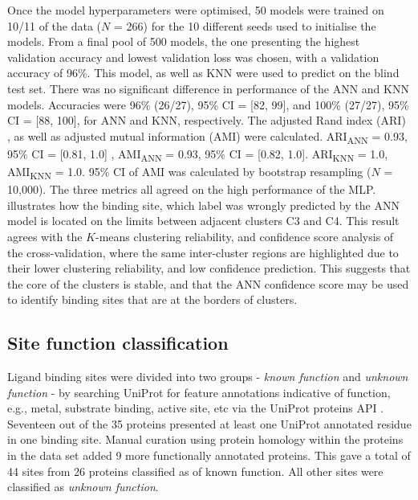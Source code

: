 Once the model hyperparameters were optimised, 50 models were trained on 10/11 of the data ($N$ = 266) for the 10 different seeds used to initialise the models. From a final pool of 500 models, the one presenting the highest validation accuracy and lowest validation loss was chosen, with a validation accuracy of 96\%. This model, as well as KNN were used to predict on the blind test set. There was no significant difference in performance of the ANN and KNN models. Accuracies were 96\% (26/27), 95\% CI = [82, 99], and 100\% (27/27), 95\% CI = [88, 100], for ANN and KNN, respectively. The adjusted Rand index (ARI) \cite{RAND_1971_ARI, HUBERT_1985_ARI}, as well as adjusted mutual information (AMI) \cite{VINH_2009_AMI, VINH_2010_AMI} were calculated. ARI\textsubscript{ANN} = 0.93, 95\% CI = [0.81, 1.0] \cite{STEINLEY_2016_ARI}, AMI\textsubscript{ANN} = 0.93, 95\% CI = [0.82, 1.0]. ARI\textsubscript{KNN} = 1.0, AMI\textsubscript{KNN} = 1.0. 95\% CI of AMI was calculated by bootstrap resampling ($N$ = 10,000). The three metrics all agreed on the high performance of the MLP.  illustrates how the binding site, which label was wrongly predicted by the ANN model is located on the limits between adjacent clusters C3 and C4. This result agrees with the $K$-means clustering reliability, and confidence score analysis of the cross-validation, where the same inter-cluster regions are highlighted due to their lower clustering reliability, and low confidence prediction. This suggests that the core of the clusters is stable, and that the ANN confidence score may be used to identify binding sites that are at the borders of clusters.

\subsection{Site function classification}

Ligand binding sites were divided into two groups - \textit{known function} and \textit{unknown function} - by searching UniProt \cite{UNIPROT_2019_UNIPROT} for feature annotations indicative of function, e.g., metal, substrate binding, active site, etc via the UniProt proteins API \cite{NIGHTINGALE_2017_API}. Seventeen out of the 35 proteins presented at least one UniProt annotated residue in one binding site. Manual curation using protein homology within the proteins in the data set added 9 more functionally annotated proteins. This gave a total of 44 sites from 26 proteins classified as of known function. All other sites were classified as \textit{unknown function}.

